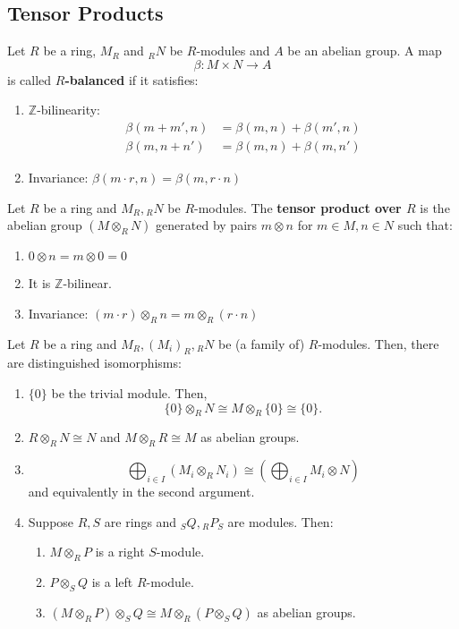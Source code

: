 \subsection*{Tensor Products}
\begin{definition}
   Let $R$ be a ring, $M_R$ and $_RN$ be $R$-modules and $A$ be an abelian group. A map \[
   \beta: M \times N \to A
   \] is called $R$\textbf{-balanced} if it satisfies:
   \begin{enumerate}
       \item $\mathbb{Z}$-bilinearity:
           \begin{align*}
               \beta(m+m',n)&=\beta(m,n)+\beta(m',n)\\
               \beta(m,n+n')&=\beta(m,n)+\beta(m,n')
           \end{align*}
        \item Invariance: $\beta(m\cdot r, n)=\beta(m,r \cdot n)$
   \end{enumerate}
\end{definition}
\begin{definition}
    Let $R$ be a ring and $M_R, {_RN}$ be $R$-modules. The \textbf{tensor product over $R$} is the abelian group $(M \otimes_R N)$ generated by pairs $m \otimes n$ for $m \in M, n \in N$ such that:
    \begin{enumerate}
        \item $0 \otimes n = m \otimes 0 =0$
        \item It is $\mathbb{Z}$-bilinear.
        \item Invariance: $(m \cdot r) \otimes_R n =m \otimes_R (r \cdot n)$
    \end{enumerate}
\end{definition}
\begin{lemma}
    Let $R$ be a ring and $M_R,(M_i)_R, {_RN}$ be (a family of) $R$-modules. Then, there are distinguished isomorphisms:
    \begin{enumerate}
        \item $\{0\}$ be the trivial module. Then, \[
                \{0\} \otimes_R N \cong M \otimes_R \{0\} \cong \{0\}
        .\] 
    \item $R \otimes_R N \cong N$ and $M \otimes_R R \cong M$ as abelian groups.
    \item \[
            \bigoplus_{i \in I} (M_i \otimes_R N_i) \cong \left( \bigoplus_{i \in I} M_i \otimes N \right)
    \] and equivalently in the second argument.
    \item Suppose $R,S$ are rings and ${_SQ}, {_RP_S}$ are modules. Then:
        \begin{enumerate}
            \item $M \otimes_R P$ is a right $S$-module.
            \item $P \otimes_S Q$ is a left $R$-module.
            \item $(M \otimes_R P)\otimes_S Q \cong M \otimes_R (P \otimes_S Q)$ as abelian groups.
        \end{enumerate}
    \end{enumerate}
\end{lemma}
